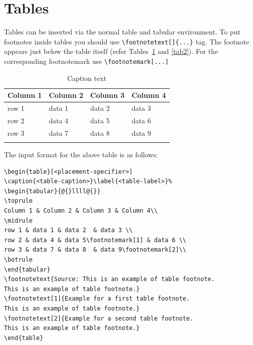 \documentclass[pdflatex,sn-mathphys-num]{sn-jnl}%
\theoremstyle{thmstyleone}%
\theoremstyle{thmstyletwo}%
\theoremstyle{thmstylethree}%
\begin{document}
\section{Tables}\label{sec6}

Tables can be inserted via the normal table and tabular environment. To put
footnotes inside tables you should use \verb+\footnotetext[]{...}+ tag.
The footnote appears just below the table itself (refer Tables~\ref{tab1} and \ref{tab2}). 
For the corresponding footnotemark use \verb+\footnotemark[...]+

\begin{table}[h]
\caption{Caption text}\label{tab1}%
\begin{tabular}{@{}llll@{}}
\toprule
Column 1 & Column 2  & Column 3 & Column 4\\
\midrule
row 1    & data 1   & data 2  & data 3  \\
row 2    & data 4   & data 5\footnotemark[1]  & data 6  \\
row 3    & data 7   & data 8  & data 9\footnotemark[2]  \\
\botrule
\end{tabular}
\end{table}

\noindent
The input format for the above table is as follows:

\bigskip
\begin{verbatim}
\begin{table}[<placement-specifier>]
\caption{<table-caption>}\label{<table-label>}%
\begin{tabular}{@{}llll@{}}
\toprule
Column 1 & Column 2 & Column 3 & Column 4\\
\midrule
row 1 & data 1 & data 2	 & data 3 \\
row 2 & data 4 & data 5\footnotemark[1] & data 6 \\
row 3 & data 7 & data 8	 & data 9\footnotemark[2]\\
\botrule
\end{tabular}
\footnotetext{Source: This is an example of table footnote. 
This is an example of table footnote.}
\footnotetext[1]{Example for a first table footnote.
This is an example of table footnote.}
\footnotetext[2]{Example for a second table footnote. 
This is an example of table footnote.}
\end{table}
\end{verbatim}
\bigskip
\end{document}
